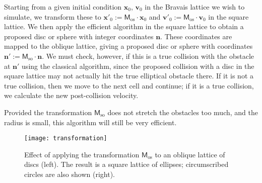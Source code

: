 \documentclass[pre,amsmath,amssymb, twocolumn, showpacs]{revtex4-1}
\renewcommand{\vec}[1]{\mathbf{#1}}
\begin{document}
Starting from a given initial condition $\vec{x}_{0}$, $\vec{v}_0$ in the Bravais lattice we wish to simulate, we transform these to 
$\vec{x}'_{0} := \mathsf{M}_\mathrm{os} \cdot \vec{x}_{0}$ and 
$\vec{v}'_{0} := \mathsf{M}_\mathrm{os} \cdot \vec{v}_{0}$
in the square lattice. 
We then apply the efficient algorithm in the square lattice to obtain a proposed disc or sphere with integer coordinates $\vec{n}$. These coordinates are mapped to the oblique lattice, giving a proposed disc or sphere with coordinates $\vec{n}' := \mathsf{M}_\mathrm{so} \cdot \vec{n}$.  We must check, however, if this is a true collision with the obstacle at $\vec{n}'$ using the classical algorithm, since the proposed collision with a disc in the square lattice may not actually hit the true elliptical obstacle there. If it is not a true collision, then we move to the next cell and continue; if it is a true collision, we calculate the new post-collision velocity. 

Provided the transformation $\mathsf{M}_\mathrm{so}$ does not stretch the obstacles too much, and the radius is small, this algorithm will still be very efficient.


\begin{figure}
\centering
\texttt{[image: transformation]}
\caption{Effect of applying the transformation $\mathsf{M}_\mathrm{os}$ to an oblique lattice of discs (left). The result is a square lattice of ellipses; circumscribed circles are also shown (right).
}
\label{fig:transformation}
\end{figure}
\end{document}
